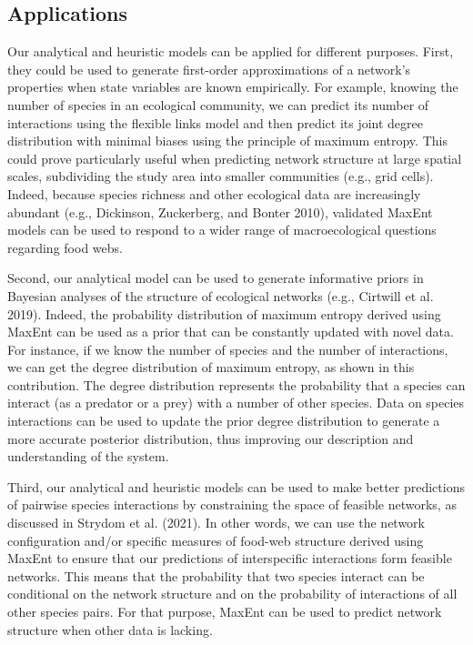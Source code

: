 \documentclass[10pt,oneside]{article}
\begin{document}
\hypertarget{applications}{%
\subsection{Applications}\label{applications}}

Our analytical and heuristic models can be applied for different
purposes. First, they could be used to generate first-order
approximations of a network's properties when state variables are known
empirically. For example, knowing the number of species in an ecological
community, we can predict its number of interactions using the flexible
links model and then predict its joint degree distribution with minimal
biases using the principle of maximum entropy. This could prove
particularly useful when predicting network structure at large spatial
scales, subdividing the study area into smaller communities (e.g., grid
cells). Indeed, because species richness and other ecological data are
increasingly abundant (e.g., Dickinson, Zuckerberg, and Bonter 2010),
validated MaxEnt models can be used to respond to a wider range of
macroecological questions regarding food webs.

Second, our analytical model can be used to generate informative priors
in Bayesian analyses of the structure of ecological networks (e.g.,
Cirtwill et al. 2019). Indeed, the probability distribution of maximum
entropy derived using MaxEnt can be used as a prior that can be
constantly updated with novel data. For instance, if we know the number
of species and the number of interactions, we can get the degree
distribution of maximum entropy, as shown in this contribution. The
degree distribution represents the probability that a species can
interact (as a predator or a prey) with a number of other species. Data
on species interactions can be used to update the prior degree
distribution to generate a more accurate posterior distribution, thus
improving our description and understanding of the system.

Third, our analytical and heuristic models can be used to make better
predictions of pairwise species interactions by constraining the space
of feasible networks, as discussed in Strydom et al. (2021). In other
words, we can use the network configuration and/or specific measures of
food-web structure derived using MaxEnt to ensure that our predictions
of interspecific interactions form feasible networks. This means that
the probability that two species interact can be conditional on the
network structure and on the probability of interactions of all other
species pairs. For that purpose, MaxEnt can be used to predict network
structure when other data is lacking.
\end{document}

